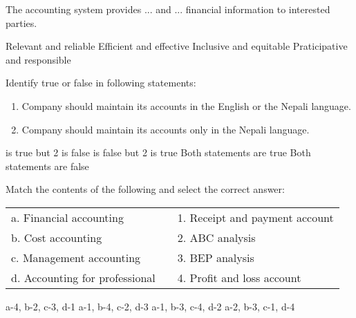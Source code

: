\begin{questions}
\question The accounting system provides ... and ... financial information to interested parties.
  \begin{choices}
  \choice Relevant and reliable
  \choice Efficient and effective
  \choice Inclusive and equitable
  \choice Praticipative and responsible
  \end{choices}

\question Identify true or false in following statements:
  \begin{enumerate}
  \item Company should maintain its accounts in the English or the Nepali language.
  \item Company should maintain its accounts only in the Nepali language.
  \end{enumerate}
  \begin{choices}
   is true but 2 is false
   is false but 2 is true
  \choice Both statements are true
  \choice Both statements are false
  \end{choices}

\question Match the contents of the following and select the correct answer:
  \begin{table}[h]
  \centering
  \begin{tabular}{lll}
    a. Financial accounting & & 1. Receipt and payment account \\[2mm]
    b. Cost accounting & & 2. ABC analysis \\
    c. Management accounting & & 3. BEP analysis \\
    d. Accounting for professional & & 4. Profit and loss account \\
  \end{tabular}
  \end{table}
  \begin{choices}
  \choice a-4, b-2, c-3, d-1
  \choice a-1, b-4, c-2, d-3
  \choice a-1, b-3, c-4, d-2
  \choice a-2, b-3, c-1, d-4
  \end{choices}


\end{questions}
